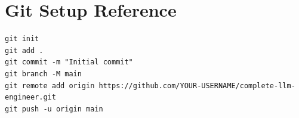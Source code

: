 \chapter{Git Setup Reference}
\label{app:git-setup}
\begin{lstlisting}[style=bashstyle]
git init
git add .
git commit -m "Initial commit"
git branch -M main
git remote add origin https://github.com/YOUR-USERNAME/complete-llm-engineer.git
git push -u origin main
\end{lstlisting}
